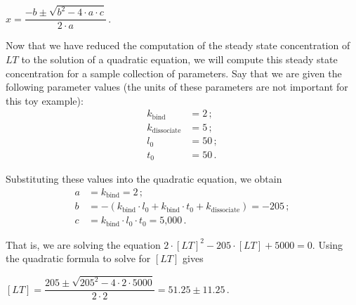 \begin{center}
$x = \dfrac{-b \pm \sqrt{b^2 - 4 \cdot a \cdot c}}{2 \cdot a}$\,.
\end{center}

\fudgespace

\begin{qbox}\end{qbox}

Now that we have reduced the computation of the steady state concentration of $LT$ to the solution of a quadratic equation, we will compute this steady state concentration for a sample collection of parameters. Say that we are given the following parameter values (the units of these parameters are not important for this toy example):
\begin{align*}
k_\text{bind} & = 2\,;\\
k_\text{dissociate} & = 5\,;\\
l_0 & = 50\,;\\
t_0 & = 50\,.
\end{align*}


\noindent Substituting these values into the quadratic equation, we obtain
\begin{align*}
a & = k_\text{bind} = 2\,;\\
b & = - (k_\text{bind} \cdot l_0 + k_\text{bind} \cdot t_0 + k_\text{dissociate}) = -205\,;\\
c & = k_\text{bind} \cdot l_0 \cdot t_0 = \text{5,000}\,.
\end{align*}

\noindent That is, we are solving the equation $2 \cdot [LT]^2 - 205 \cdot [LT] + 5000 = 0$. Using the quadratic formula to solve for $[LT]$ gives

\begin{center}
$[LT] = \dfrac{205 \pm \sqrt{205^2 - 4 \cdot 2 \cdot 5000}}{2 \cdot 2} = 51.25 \pm 11.25$\,.
\end{center}


